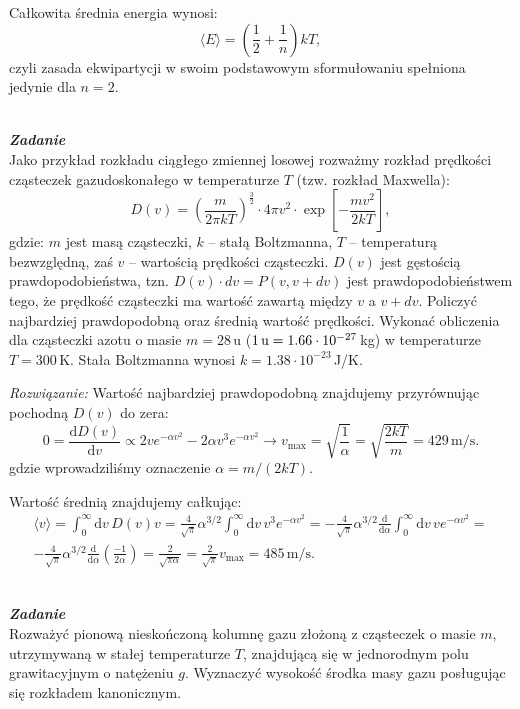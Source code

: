 \documentclass[11pt,a4paper]{article}
\newcounter{zadanie}\newcommand{\zadanie}[1][]{\addtocounter{zadanie}{1} ~\\  {\bf \emph{Zadanie \arabic{zadanie} #1 }} \\}
\renewcommand{\t}[1]{\textrm{#1}}
\begin{document}
Całkowita średnia energia wynosi:
$$
\langle E \rangle = (\frac{1}{2} + \frac{1}{n}) k T,
$$
czyli zasada ekwipartycji w swoim podstawowym sformułowaniu spełniona jedynie dla $n=2$.

\newpage

\zadanie
Jako przykład rozkładu ciągłego zmiennej losowej rozważmy
rozkład prędkości cząsteczek gazu\linebreak doskonałego w temperaturze $T$
(tzw. rozkład Maxwella):
\[ D(v) = \left(\frac{m}{2\pi k T}\right)^{\frac{3}{2}}
          \cdot 4 \pi v^2 \cdot\exp\left[ -\frac{m v^2}{2 k T} \right],\]
gdzie: $m$ jest masą cząsteczki, $k$ – stałą Boltzmanna, $T$ – temperaturą bezwzględną, zaś $v$ – wartością prędkości cząsteczki.
$D(v)$ jest gęstością prawdopodobieństwa, tzn. $D(v)\cdot dv = P(v, v+dv)$ jest prawdopodobieństwem tego, że prędkość cząsteczki ma wartość zawartą między
$v$ a $v+dv$. Policzyć najbardziej prawdopodobną oraz średnią wartość prędkości. Wykonać obliczenia dla cząsteczki azotu o masie $m = 28\,$u ($1\,{\rm u} = 1.66\cdot 10^{-27}\,$kg) w temperaturze $T = 300\,$K.
Stała Boltzmanna wynosi $k = 1.38\cdot 10^{-23}\,$J/K.
\newline

\emph{Rozwiązanie:}
Wartość najbardziej prawdopodobną znajdujemy przyrównując pochodną $D(v)$ do zera:
$$
0= \frac{\t{d} D(v)}{\t{d} v}  \propto 2 v e^{- \alpha v^2} - 2 \alpha v^3 e^{-\alpha v^2}  \longrightarrow v_{\t{max}} = \sqrt{\frac{1}{\alpha}} = \sqrt{\frac{2 k T}{m}} = 429\, \textrm{m}/\textrm{s}.
$$
gdzie wprowadziliśmy oznaczenie $\alpha = m/(2k T)$.

Wartość średnią znajdujemy całkując:
\begin{multline*}
\langle v \rangle = \int_{0}^\infty \t{d} v \, D(v) v = \frac{4}{\sqrt{\pi}} \alpha^{3/2} \int_0^\infty \t{d}v\, v^3 e^{-\alpha v^2} =
- \frac{4}{\sqrt{\pi}} \alpha^{3/2} \frac{\t{d}}{\t{d} \alpha} \int_0^\infty \t{d}v\, v e^{-\alpha v^2} =\\ - \frac{4}{\sqrt{\pi}} \alpha^{3/2} \frac{\t{d}}{\t{d}\alpha} \left(
\frac{-1}{2\alpha}\right) = \frac{2 }{\sqrt{ \pi \alpha}} =  \frac{2}{\sqrt{\pi}} v_{\textrm{max}} = 485\, \textrm{m}/\textrm{s}.
\end{multline*}

\newpage

\zadanie
Rozważyć pionową nieskończoną kolumnę gazu złożoną z cząsteczek o masie $m$,
utrzymywaną w stałej temperaturze $T$, znajdującą się w jednorodnym polu grawitacyjnym
o natężeniu $g$. Wyznaczyć wysokość środka masy gazu posługując się rozkładem kanonicznym.
\newline
\end{document}
